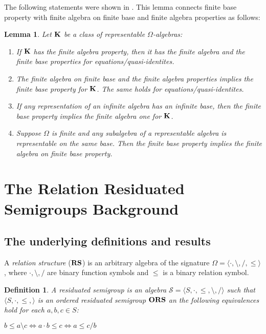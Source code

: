 \documentclass[a4paper]{article}
\theoremstyle{defin}
\newtheorem{defin}{Definition}
\theoremstyle{theorem}
\theoremstyle{prop}
\theoremstyle{lemma}
\newtheorem{lemma}{Lemma}
\theoremstyle{ex}
\theoremstyle{col}
\begin{document}
The following statements were shown in \cite{andreka1999finite}. This lemma connects finite base property with finite algebra on finite base and finite algebra properties as follows:
\begin{lemma}
  Let ${\bf K}$ be a class of representable $\Omega$-algebras:
  \begin{enumerate}
    \item If ${\bf K}$ has the finite algebra property, then it has the finite algebra and the finite base properties for equations/quasi-identites.
    \item The finite algebra on finite base and the finite algebra properties implies the finite base property for ${\bf K}$. The same holds for equations/quasi-identites.
    \item If any representation of an infinite algebra has an infinite base, then the finite base property implies the finite algebra one for ${\bf K}$.
    \item Suppose $\Omega$ is finite and any subalgebra of a representable algebra is representable on the same base. Then the finite base property implies the finite algebra on finite base property.
  \end{enumerate}
\end{lemma}

\section{The Relation Residuated Semigroups Background}

\subsection{The underlying definitions and results}

 A \emph{relation structure} (${\bf RS}$) is an arbitrary algebra of the signature $\Omega = \langle \cdot, \setminus, /, \leq \rangle$, where $\cdot, \setminus, /$ are binary function symbols and $\leq$ is a binary relation symbol.

\begin{defin}
  A residuated semigroup is an algebra $\mathcal{S} = \langle S, \cdot, \leq, \setminus, / \rangle$ such that $\langle S, \cdot, \leq, \rangle$ is an ordered residuated semigroup ${\bf ORS}$ an the following equivalences hold for each $a, b, c \in S$:

  \begin{center}
    $b \leq a \setminus c \Leftrightarrow a \cdot b \leq c \Leftrightarrow a \leq c / b$
  \end{center}
\end{defin}
\end{document}
